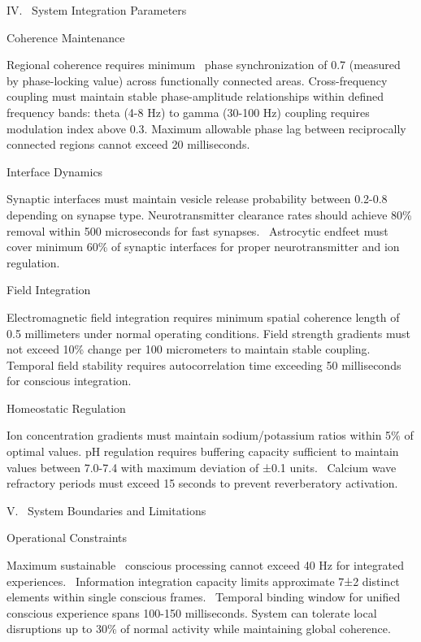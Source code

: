 IV.~ System Integration Parameters

 Coherence Maintenance

Regional coherence requires minimum~ phase synchronization of 0.7 (measured by phase-locking value) across functionally connected areas. Cross-frequency coupling must maintain stable phase-amplitude relationships within defined frequency bands: theta (4-8 Hz) to gamma (30-100 Hz) coupling requires modulation index above 0.3. Maximum allowable phase lag between reciprocally connected regions cannot exceed 20 milliseconds.

 Interface Dynamics

 Synaptic interfaces must maintain vesicle release probability between 0.2-0.8 depending on synapse type. Neurotransmitter clearance rates should achieve 80\% removal within 500 microseconds for fast synapses.~ Astrocytic endfeet must cover minimum 60\% of synaptic interfaces for proper neurotransmitter and ion regulation.

 Field Integration

 Electromagnetic field integration requires minimum spatial coherence length of 0.5 millimeters under normal operating conditions. Field strength gradients must not exceed 10\% change per 100 micrometers to maintain stable coupling. Temporal field stability requires autocorrelation time exceeding 50 milliseconds for conscious integration.

 Homeostatic Regulation

 Ion concentration gradients must maintain sodium/potassium ratios within 5\% of optimal values. pH regulation requires buffering capacity sufficient to maintain values between 7.0-7.4 with maximum deviation of ±0.1 units.~ Calcium wave refractory periods must exceed 15 seconds to prevent reverberatory activation.

V.~ System Boundaries and Limitations

 Operational Constraints

Maximum sustainable~ conscious processing cannot exceed 40 Hz for integrated experiences.~ Information integration capacity limits approximate 7±2 distinct elements within single conscious frames.~ Temporal binding window for unified conscious experience spans 100-150 milliseconds. System can tolerate local disruptions up to 30\% of normal activity while maintaining global coherence.

